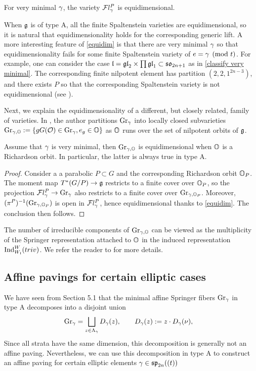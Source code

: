 \documentclass[11pt]{article}
\numberwithin{equation}{section}
\begin{document}
\begin{pro}\label{equidim}
    For very minimal $\gamma$, the variety $\mathcal{F}l_\gamma^P$ is equidimensional.
\end{pro}

\begin{rem}
     When $\mathfrak{g}$ is of type A, all the finite Spaltenstein varieties are equidimensional, so it is natural that equidimensionality holds for the corresponding generic lift. A more interesting feature of \cref{equidim} is that there are very minimal $\gamma$ so that equidimensionality fails for some finite Spaltenstein variety of $e=\gamma \pmod{t}$. For example, one can consider the case $\mathfrak{l}= \mathfrak{gl}_2\times \prod \mathfrak{gl}_1\subset \mathfrak{so}_{2n+1}$ as in \cref{classify very minimal}. The corresponding finite nilpotent element has partition $(2,2,1^{2n-3})$, and there exists $P$ so that the corresponding Spaltenstein variety is not equidimensional (see \cite{Meyer2026}). 
\end{rem}

Next, we explain the equidimensionality of a different, but closely related, family of varieties. In \cite{Yun2021}, the author partitions $\operatorname{Gr}_\gamma$ into locally closed subvarieties $\operatorname{Gr}_{\gamma,\mathbb{O}}:= \{gG(\mathcal{O})\in \operatorname{Gr}_\gamma, e_g\in {\mathbb{O}}\}$ as $\mathbb{O}$ runs over the set of nilpotent orbits of $\mathfrak{g}$. 
\begin{cor}
    Assume that $\gamma$ is very minimal, then $\operatorname{Gr}_{\gamma,\mathbb{O}}$ is equidimensional when $\mathbb{O}$ is a Richardson orbit. In particular, the latter is always true in type A.
\end{cor}
\begin{proof}
    Consider a a parabolic $P\subset G$ and the corresponding Richardson orbit $\mathbb{O}_P$. The moment map $T^*(G/P)\to \mathfrak{g}$ restricts to a finite cover over $\mathbb{O}_P$, so the projection $\mathcal{F}l_\gamma^P \to \operatorname{Gr}_\gamma$ also restricts to a finite cover over $\operatorname{Gr}_{\gamma,\mathbb{O}_P}$. Moreover, $(\pi^P)^{-1}(\operatorname{Gr}_{\gamma,\mathbb{O}_P})$ is open in $\mathcal{F}l_\gamma^P$, hence equidimensional thanks to \cref{equidim}. The conclusion then follows.
\end{proof}
The number of irreducible components of $\operatorname{Gr}_{\gamma,\mathbb{O}}$ can be viewed as the multiplicity of the Springer representation attached to $\mathbb{O}$ in the induced representation $\operatorname{Ind}_{W_{\mathfrak{l}}}^{W}(triv)$. We refer the reader to \cite{Yunfiltration} for more details.

\subsection{Affine pavings for certain elliptic cases}
We have seen from Section 5.1 that the minimal affine Springer fibers $\operatorname{Gr}_\gamma$ in type A decomposes into a disjoint union
\[
\operatorname{Gr}_\gamma
=
\bigsqcup_{z\in\Lambda_\gamma}
D_\gamma(z),
\qquad
D_\gamma(z):=z\cdot D_\gamma(\nu),
\]
Since all strata have the same dimension, this decomposition is generally not an affine paving. Nevertheless, we can use this decomposition in type A to construct an affine paving for certain elliptic elements $\gamma\in \mathfrak{sp}_{2n}((t))$
\end{document}
